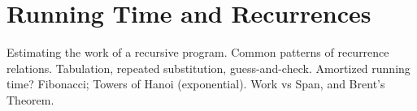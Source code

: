 
\section{Running Time and Recurrences}
Estimating the work of a recursive program. Common patterns of recurrence relations. Tabulation, repeated substitution, guess-and-check. Amortized running time? Fibonacci; Towers of Hanoi (exponential). Work vs Span, and Brent's Theorem.
